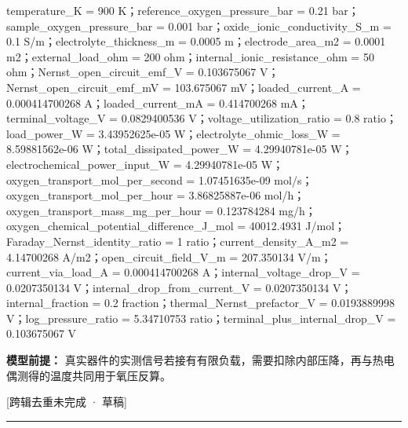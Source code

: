\documentclass[UTF8,11pt,a4paper]{ctexart}
\begin{document}
temperature\_K = 900 K；reference\_oxygen\_pressure\_bar = 0.21 bar；sample\_oxygen\_pressure\_bar = 0.001 bar；oxide\_ionic\_conductivity\_S\_m = 0.1 S/m；electrolyte\_thickness\_m = 0.0005 m；electrode\_area\_m2 = 0.0001 m2；external\_load\_ohm = 200 ohm；internal\_ionic\_resistance\_ohm = 50 ohm；Nernst\_open\_circuit\_emf\_V = 0.103675067 V；Nernst\_open\_circuit\_emf\_mV = 103.675067 mV；loaded\_current\_A = 0.000414700268 A；loaded\_current\_mA = 0.414700268 mA；terminal\_voltage\_V = 0.0829400536 V；voltage\_utilization\_ratio = 0.8 ratio；load\_power\_W = 3.43952625e-05 W；electrolyte\_ohmic\_loss\_W = 8.59881562e-06 W；total\_dissipated\_power\_W = 4.29940781e-05 W；electrochemical\_power\_input\_W = 4.29940781e-05 W；oxygen\_transport\_mol\_per\_second = 1.07451635e-09 mol/s；oxygen\_transport\_mol\_per\_hour = 3.86825887e-06 mol/h；oxygen\_transport\_mass\_mg\_per\_hour = 0.123784284 mg/h；oxygen\_chemical\_potential\_difference\_J\_mol = 40012.4931 J/mol；Faraday\_Nernst\_identity\_ratio = 1 ratio；current\_density\_A\_m2 = 4.14700268 A/m2；open\_circuit\_field\_V\_m = 207.350134 V/m；current\_via\_load\_A = 0.000414700268 A；internal\_voltage\_drop\_V = 0.0207350134 V；internal\_drop\_from\_current\_V = 0.0207350134 V；internal\_fraction = 0.2 fraction；thermal\_Nernst\_prefactor\_V = 0.0193889998 V；log\_pressure\_ratio = 5.34710753 ratio；terminal\_plus\_internal\_drop\_V = 0.103675067 V\par
\noindent\textbf{模型前提：}
真实器件的实测信号若接有有限负载，需要扣除内部压降，再与热电偶测得的温度共同用于氧压反算。\par
\noindent\textcolor{red!65!black}{[跨辑去重未完成 · 草稿]} \par
\medskip\hrule\medskip
{}
\end{document}

